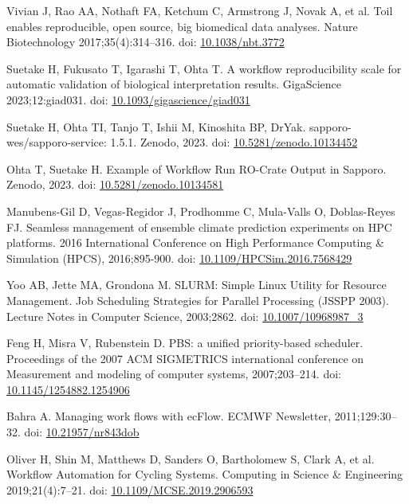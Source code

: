 \documentclass[10pt,letterpaper]{article}
\begin{document}
\begin{thebibliography}{10}
\begin{small}
Vivian J, Rao AA, Nothaft FA, Ketchum C, Armstrong J, Novak A, et al.
Toil enables reproducible, open source, big biomedical data analyses.
Nature Biotechnology 2017;35(4):314--316.
doi: \href{https://doi.org/10.1038/nbt.3772}{10.1038/nbt.3772}

Suetake H, Fukusato T, Igarashi T, Ohta T.
A workflow reproducibility scale for automatic validation of biological interpretation results.
GigaScience 2023;12:giad031.
doi: \href{https://doi.org/10.1093/gigascience/giad031}{10.1093/gigascience/giad031}

Suetake H, Ohta TI, Tanjo T, Ishii M, Kinoshita BP, DrYak.
sapporo-wes/sapporo-service: 1.5.1.
Zenodo, 2023.
doi: \href{https://doi.org/10.5281/zenodo.10134452}{10.5281/zenodo.10134452}

Ohta T, Suetake H.
Example of Workflow Run RO-Crate Output in Sapporo.
Zenodo, 2023.
doi: \href{https://doi.org/10.5281/zenodo.10134581}{10.5281/zenodo.10134581}

Manubens-Gil D, Vegas-Regidor J, Prodhomme C, Mula-Valls O, Doblas-Reyes FJ.
Seamless management of ensemble climate prediction experiments on HPC platforms.
2016 International Conference on High Performance Computing \& Simulation (HPCS), 2016;895-900.
doi: \href{https://doi.org/10.1109/HPCSim.2016.7568429}{10.1109/HPCSim.2016.7568429}

Yoo AB, Jette MA, Grondona M.
SLURM: Simple Linux Utility for Resource Management.
Job Scheduling Strategies for Parallel Processing (JSSPP 2003). Lecture Notes in Computer Science, 2003;2862.
doi: \href{https://doi.org/10.1007/10968987_3}{10.1007/10968987\_3}

Feng H, Misra V, Rubenstein D.
PBS: a unified priority-based scheduler.
Proceedings of the 2007 ACM SIGMETRICS international conference on Measurement and modeling of computer systems, 2007;203--214.
doi: \href{https://doi.org/10.1145/1254882.1254906}{10.1145/1254882.1254906}

Bahra A.
Managing work flows with ecFlow.
ECMWF Newsletter, 2011;129:30--32.
doi: \href{https://doi.org/10.21957/nr843dob}{10.21957/nr843dob}

Oliver H, Shin M, Matthews D, Sanders O, Bartholomew S, Clark A, et al.
Workflow Automation for Cycling Systems.
Computing in Science \& Engineering 2019;21(4):7--21.
doi: \href{https://doi.org/10.1109/MCSE.2019.2906593}{10.1109/MCSE.2019.2906593}


\end{small}
\end{thebibliography}
\end{document}
